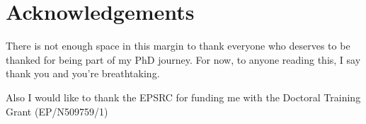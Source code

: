\chapter*{Acknowledgements}

There is not enough space in this margin to thank everyone who deserves to be thanked for being part of my PhD journey. For now, to anyone reading this, I say thank you and you're breathtaking.

Also I would like to thank the EPSRC for funding me with the Doctoral Training Grant
(EP/N509759/1)

\begin{comment}

Attempting to complete a PhD has been a great undertaking, and in completing
this thesis I am nearing the end of an important chapter in my life.  The years
I have spent as a postgraduate researcher have probably been the happiest of my
life, but at times the work involved has been tough, and without the support of
people around me I certainly couldn't have made it this far.  Almost everyone I
have met and got to know during this period has touched my life in a positive
way, but there are a few people in particular that I wish to thank.

Firstly, I would like to thank my supervisor James D.~Mitchell, for his honesty
and friendliness, and for the many hours he has spent correcting my work and
making me a better mathematician.  Secondly, I would like to thank my friend and
office-mate Wilf Wilson, whose wonderful company has kept me from falling asleep
through many weary afternoons of writing and coding.  I am also indebted to the
Engineering and Physical Sciences Research Council (EPSRC), whose generous grant
has allowed me to pursue computational semigroup theory freely for the last four
years.

Finally, I wish to thank Claire Young.  She has been the most important part of
my life throughout my postgraduate career, and her love and support during the
tougher moments of this PhD have given me the motivation to overcome what
sometimes felt like insurmountable obstacles.

\begin{flushright}
  Michael Torpey

  \singlespacing
  \textit{St Andrews \\July 2018}
\end{flushright}

\vspace{2.0em}
\noindent
Having completed the final version of this thesis, I also wish to thank my
examiners Martyn Quick and Wolfram Bentz, for the time and effort they spent
reading my work, conducting my viva, and providing the detailed feedback that
helped me improve this thesis to its current state.

\begin{flushright}
  Michael Torpey

  \singlespacing
  \textit{St Andrews \\February 2019}
\end{flushright}

\end{comment}

